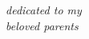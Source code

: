 
\begin{titlepage}
\begin{center}

    \thispagestyle{empty}
    \vspace*{\fill}
    
    \textit{dedicated to my \\
    \vspace{0.1cm}
    beloved parents
    }
      

    \vspace*{\fill}
\end{center}
\end{titlepage}